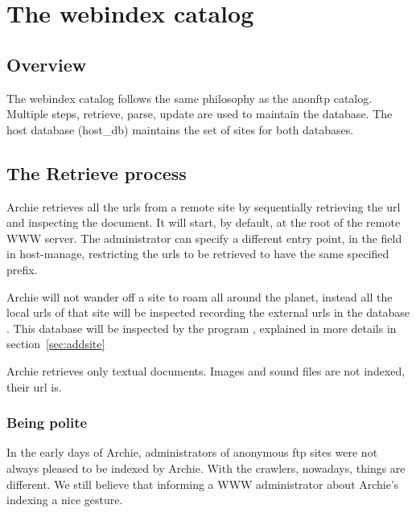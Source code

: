 %
%
%
%


\chapter{The webindex catalog}

\new

\section{Overview}

The webindex catalog follows the same philosophy as the anonftp catalog.
Multiple steps, retrieve, parse, update  are used to maintain the database.
The host database (host_db) maintains the set of sites for both databases.



\section{The Retrieve process}

Archie retrieves all the urls from a remote site by sequentially retrieving
the url and inspecting the document. It will start, by default, at the root of
the remote WWW server. The administrator can specify a different entry
point, in the  field in host-manage, restricting the urls
to be retrieved to have the same specified prefix.

Archie will not wander off a site to roam all around the planet, instead
all the local urls of that site will be inspected recording the external
urls in the database .
This database will be inspected by the program , explained
in more details in section~\ref{sec:addsite}

Archie retrieves only textual documents. Images and sound files are not
indexed, their url is. 

\subsection{Being polite} 

In the early days of Archie, administrators of anonymous ftp sites were
not always pleased to be indexed by Archie. With the crawlers, nowadays,
things are different. We still believe that 
informing a WWW administrator about Archie's indexing a nice gesture.

